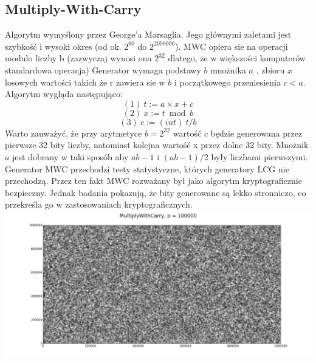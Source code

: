 \documentclass[a4paper, 11pt]{article} %
\begin{document}
\subsection{Multiply-With-Carry}
Algorytm wymyślony przez George'a Marsaglia. Jego głównymi zaletami jest szybkość i wysoki okres (od ok. $2^{60} $ do $2^{2000000}$).
MWC opiera sie na operacji modulo liczby b (zazwyczaj wynosi ona $2^{32}$ dlatego, że w większości komputerów standardowa operacja) 
Generator wymaga podstawy $b$ mnożnika $a$ , zbioru $x$ losowych wartości takich że r zawiera sie w $b$ i początkowego przeniesienia $c < a$. 
Algorytm wygląda następująco:
$$(1)\ t:=a \times x + c $$
$$(2)\ x:= t \bmod  b $$
$$(3)\ c:= (int)\ t/b$$
Warto zauważyć, że przy arytmetyce $b=2^{32}$ wartość $c$ będzie generowana przez pierwsze 32 bity liczby, natomiast kolejna wartość x przez dolne 32 bity. Mnożnik $a$ jest dobrany w taki sposób aby $ab-1$ i $(ab-1)/2$ były liczbami pierwszymi.
\newline Generator MWC przechodzi testy statystyczne, których generatory LCG nie przechodzą. Przez ten fakt MWC rozważany był jako algorytm kryptograficznie bezpieczny. Jednak badania pokazują, że bity generowane są lekko stronniczo, co przekreśla go w zastosowaniach kryptograficznych.	
\includegraphics[width=\linewidth]{img/mwc-1.png}





%

%

\end{document}
